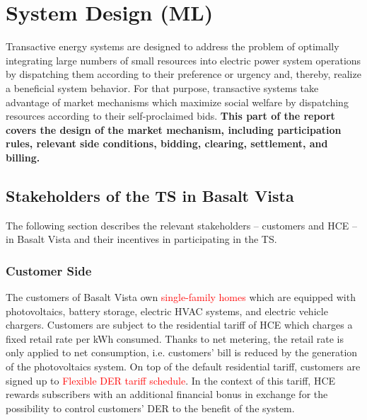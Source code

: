 
\chapter{System Design (ML)}

Transactive energy systems are designed to address the problem of optimally integrating large numbers of small resources into electric power system operations by dispatching them according to their preference or urgency and, thereby, realize a beneficial system behavior. For that purpose, transactive systems take advantage of market mechanisms which maximize social welfare by dispatching resources according to their self-proclaimed bids. \textbf{This part of the report covers the design of the market mechanism, including participation rules, relevant side conditions, bidding, clearing, settlement, and billing.}

\section{Stakeholders of the TS in Basalt Vista}

The following section describes the relevant stakeholders -- customers and HCE -- in Basalt Vista and their incentives in participating in the TS.

\subsection{Customer Side}

The customers of Basalt Vista own \textcolor{red}{single-family homes} which are equipped with photovoltaics, battery storage, electric HVAC systems, and electric vehicle chargers. Customers are subject to the residential tariff of HCE which charges a fixed retail rate per kWh consumed. Thanks to net metering, the retail rate is only applied to net consumption, i.e. customers' bill is reduced by the generation of the photovoltaics system. On top of the default residential tariff, customers are signed up to \textcolor{red}{Flexible DER tariff schedule}. In the context of this tariff, HCE rewards subscribers with an additional financial bonus in exchange for the possibility to control customers' DER to the benefit of the system. 

